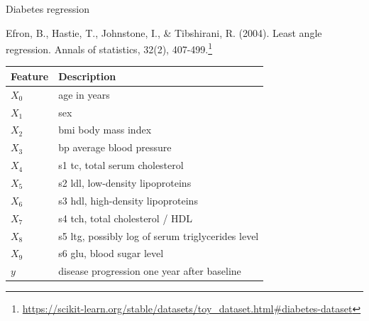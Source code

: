 \documentclass[obeyspaces,aspectratio=43]{beamer}
\renewcommand{\href}[2]{#2\footnote{\url{#1}}}
\begin{document}
\begin{frame}{Decision Tree}

\texttt{[image: ./graphics/\{tree\_class\_diab]}.png}

\end{frame}

\begin{frame}{Diabetes regression}

\href{https://scikit-learn.org/stable/datasets/toy_dataset.html\#diabetes-dataset}{Efron,
B., Hastie, T., Johnstone, I., \& Tibshirani, R. (2004). Least angle
regression. Annals of statistics, 32(2), 407-499.}

\tiny

\begin{longtable}[c]{@{}ll@{}}
\toprule
Feature & Description\tabularnewline
\midrule
\endhead
\(X_0\) & age in years\tabularnewline
\(X_1\) & sex\tabularnewline
\(X_2\) & bmi body mass index\tabularnewline
\(X_3\) & bp average blood pressure\tabularnewline
\(X_4\) & s1 tc, total serum cholesterol\tabularnewline
\(X_5\) & s2 ldl, low-density lipoproteins\tabularnewline
\(X_6\) & s3 hdl, high-density lipoproteins\tabularnewline
\(X_7\) & s4 tch, total cholesterol / HDL\tabularnewline
\(X_8\) & s5 ltg, possibly log of serum triglycerides
level\tabularnewline
\(X_9\) & s6 glu, blood sugar level\tabularnewline
\(y\) & disease progression one year after baseline\tabularnewline
\bottomrule
\end{longtable}

\end{frame}
\end{document}
